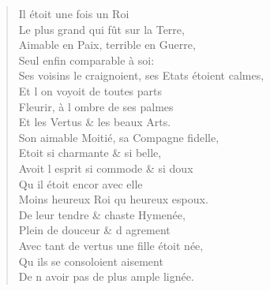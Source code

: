 \begin{verse}
\vin Il étoit une fois un Roi \\
\vin\vin Le plus grand qui fût sur la Terre, \\
\vin Aimable en Paix, terrible en Guerre, \\
\vin Seul enfin comparable à soi: \\
Ses voisins le craignoient, ses Etats étoient calmes, \\
\vin Et l\textquotesingle{} on voyoit de toutes parts \\
\vin Fleurir, à l\textquotesingle{} ombre de ses palmes \\
\vin Et les Vertus \& les beaux Arts. \\
Son aimable Moitié, sa Compagne fidelle, \\
\vin Etoit si charmante \& si belle, \\
Avoit l\textquotesingle{} esprit si commode \& si doux \\
\vin Qu\textquotesingle{} il étoit encor avec elle \\
\vin Moins heureux Roi qu\textquotesingle{} heureux espoux. \\
\vin De leur tendre \& chaste Hymenée, \\
\vin Plein de douceur \& d\textquotesingle{} agrement \\
Avec tant de vertus une fille étoit née, \\
\vin Qu\textquotesingle{} ils se consoloient aisement \\
\vin De n\textquotesingle{} avoir pas de plus ample lignée.


\end{verse}
